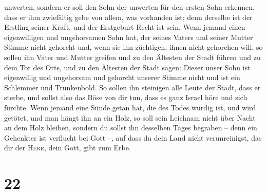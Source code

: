 unwerten,  sondern er soll den Sohn der unwerten für den
ersten Sohn erkennen, dass er ihm zwiefältig gebe von allem, was
vorhanden ist; denn derselbe ist der Erstling seiner Kraft, und der
Erstgeburt Recht ist sein.  Wenn jemand einen
eigenwilligen und ungehorsamen Sohn hat, der seines Vaters und seiner
Mutter Stimme nicht gehorcht und, wenn sie ihn züchtigen, ihnen nicht
gehorchen will,  so sollen ihn Vater und Mutter greifen
und zu den Ältesten der Stadt führen und zu dem Tor des Orts,
 und zu den Ältesten der Stadt sagen: Dieser unser Sohn
ist eigenwillig und ungehorsam und gehorcht unserer Stimme nicht und ist
ein Schlemmer und Trunkenbold.  So sollen ihn steinigen
alle Leute der Stadt, dass er sterbe, und sollst also das Böse von dir
tun, dass es ganz Israel höre und sich fürchte.  Wenn
jemand eine Sünde getan hat, die des Todes würdig ist, und wird getötet,
und man hängt ihn an ein Holz,  so soll sein Leichnam
nicht über Nacht an dem Holz bleiben, sondern du sollst ihn desselben
Tages begraben -- denn ein Gehenkter ist verflucht bei Gott --, auf dass
du dein Land nicht verunreinigst, das dir der \textsc{Herr}, dein Gott,
gibt zum Erbe.

\hypertarget{section-21}{%
\section{22}\label{section-21}}

